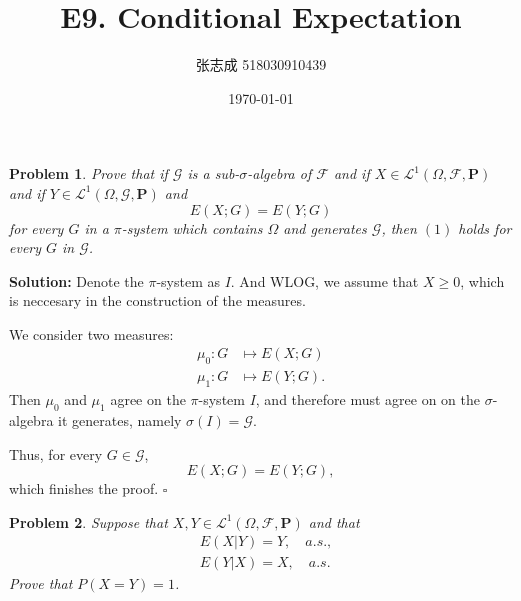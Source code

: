 \documentclass[UTF8, 12pt]{article}
\title{E9. Conditional Expectation}
\author{张志成 518030910439}
\date{\today}
\newenvironment{solution}{\noindent\ignorespaces\textbf{Solution:}}{\hfill $\square$\par\noindent}
\newtheorem{problem}{Problem}
\begin{document}
    \maketitle

    \begin{problem}
        Prove that if $\mathcal{G}$ is a sub-$\sigma$-algebra of $\mathcal{F}$ and if $X \in \mathcal{L}^1(\Omega, \mathcal{F}, \mathbf{P})$ and if $Y \in \mathcal{L}^1(\Omega, \mathcal{G}, \mathbf{P})$ and 
        \begin{equation}
        E(X;G) = E(Y;G)
        \end{equation}
        for every $G$ in a $\pi$-system which contains $\Omega$ and generates $\mathcal{G}$, then $(1)$ holds for every $G$ in $\mathcal{G}$.
    \end{problem}

    \begin{solution}
        Denote the $\pi$-system as $I$. And WLOG, we assume that $X \geq 0$, which is neccesary in the construction of the measures.

        We consider two measures:
        \begin{align*}
            \mu_0: G&\mapsto E(X;G) \\
            \mu_1: G&\mapsto E(Y;G) .
        \end{align*}
        Then $\mu_0$ and $\mu_1$ agree on the $\pi$-system $I$, and therefore must agree on on the $\sigma$-algebra it generates, namely $\sigma(I) = \mathcal{G}$.
        
        Thus, for every $G \in \mathcal{G}$,
        $$
        E(X;G) = E(Y;G) ,
        $$
        which finishes the proof.
    \end{solution}

    \begin{problem}
        Suppose that $X,Y \in \mathcal{L}^1(\Omega, \mathcal{F}, \mathbf{P})$ and that
        \begin{align*}
            &E(X|Y) = Y,\quad a.s., \\
            &E(Y|X) = X,\quad a.s.
        \end{align*}
        Prove that $P(X = Y) = 1$.
    \end{problem}
\end{document}
